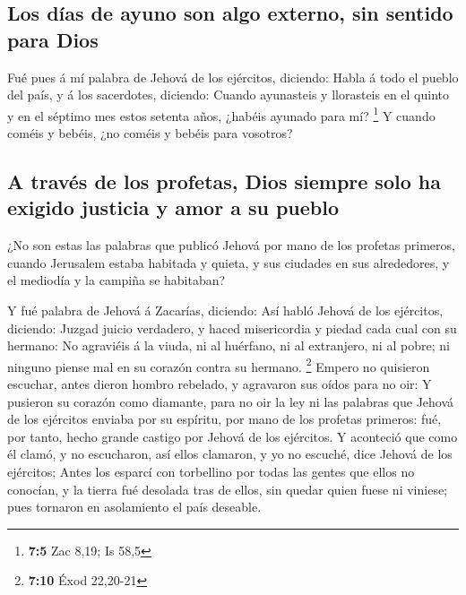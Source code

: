 \hypertarget{los-duxedas-de-ayuno-son-algo-externo-sin-sentido-para-dios}{%
\subsection{Los días de ayuno son algo externo, sin sentido para
Dios}\label{los-duxedas-de-ayuno-son-algo-externo-sin-sentido-para-dios}}

 Fué pues á mí palabra de Jehová de los ejércitos, diciendo:
 Habla á todo el pueblo del país, y á los sacerdotes,
diciendo: Cuando ayunasteis y llorasteis en el quinto y en el séptimo
mes estos setenta años, ¿habéis ayunado para mí? \footnote{\textbf{7:5}
  Zac 8,19; Is 58,5}  Y cuando coméis y bebéis, ¿no coméis y
bebéis para vosotros?

\hypertarget{a-travuxe9s-de-los-profetas-dios-siempre-solo-ha-exigido-justicia-y-amor-a-su-pueblo}{%
\subsection{A través de los profetas, Dios siempre solo ha exigido
justicia y amor a su
pueblo}\label{a-travuxe9s-de-los-profetas-dios-siempre-solo-ha-exigido-justicia-y-amor-a-su-pueblo}}

 ¿No son estas las palabras que publicó Jehová por mano de
los profetas primeros, cuando Jerusalem estaba habitada y quieta, y sus
ciudades en sus alrededores, y el mediodía y la campiña se habitaban?

 Y fué palabra de Jehová á Zacarías, diciendo: 
Así habló Jehová de los ejércitos, diciendo: Juzgad juicio verdadero, y
haced misericordia y piedad cada cual con su hermano:  No
agraviéis á la viuda, ni al huérfano, ni al extranjero, ni al pobre; ni
ninguno piense mal en su corazón contra su hermano. \footnote{\textbf{7:10}
  Éxod 22,20-21}  Empero no quisieron escuchar, antes
dieron hombro rebelado, y agravaron sus oídos para no oir: 
Y pusieron su corazón como diamante, para no oir la ley ni las palabras
que Jehová de los ejércitos enviaba por su espíritu, por mano de los
profetas primeros: fué, por tanto, hecho grande castigo por Jehová de
los ejércitos.  Y aconteció que como él clamó, y no
escucharon, así ellos clamaron, y yo no escuché, dice Jehová de los
ejércitos;  Antes los esparcí con torbellino por todas las
gentes que ellos no conocían, y la tierra fué desolada tras de ellos,
sin quedar quien fuese ni viniese; pues tornaron en asolamiento el país
deseable.

